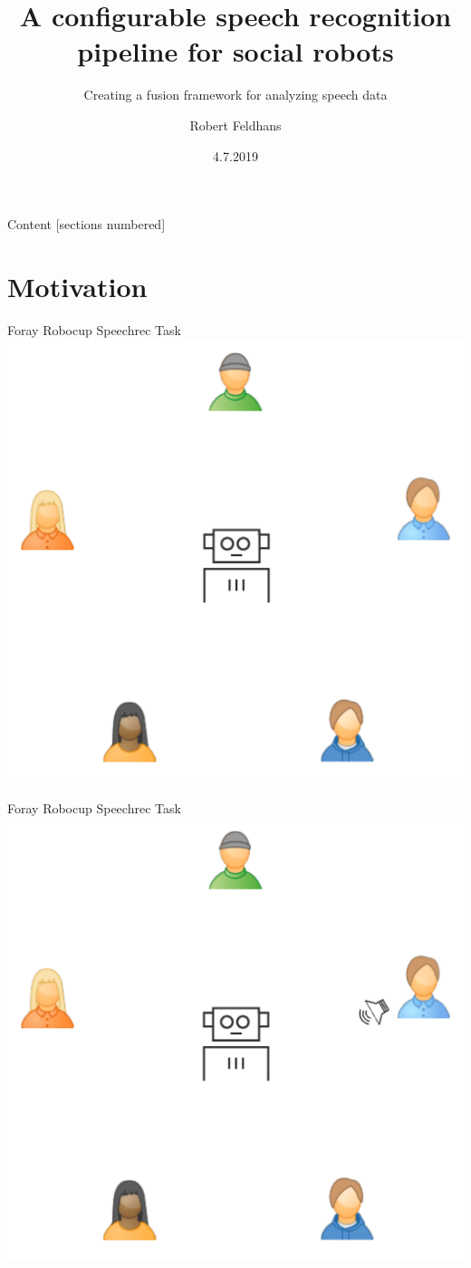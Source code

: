 \documentclass{beamer}
\title{A configurable speech recognition pipeline for social robots}
\subtitle{Creating a fusion framework for analyzing speech data}
\date{4.7.2019}
\institute{Master Thesis}
\author{Robert Feldhans}
\begin{document}
	\maketitle
	
	\begin{frame}{Content}
		[sections numbered]
		\tableofcontents[hideallsubsections]
	\end{frame}
	
	\section{Motivation}
	

	
	\begin{frame}{Foray Robocup Speechrec Task}
		\centering
		\includegraphics[width=.75\textwidth]{Bilder/robocup_task}
	\end{frame}
	
	\begin{frame}{Foray Robocup Speechrec Task}
		\centering
		\includegraphics[width=.75\textwidth]{Bilder/robocup_task_1}
	\end{frame}
	
\end{document}
